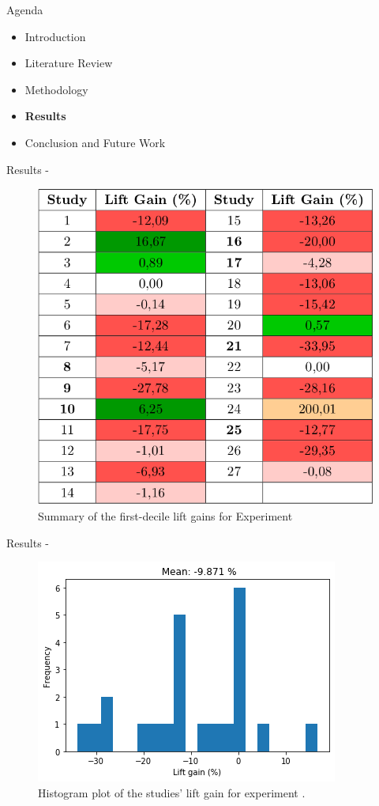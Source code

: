 \begin{frame}{Agenda}
\begin{itemize}
    \item Introduction
    \item Literature Review
    \item Methodology
    \item \textbf{Results}
    \item Conclusion and Future Work
\end{itemize}
\end{frame}


\begin{frame}{Results - \fullNameExperimentI{}} \pause
    \begin{figure}
        \centering
        \includegraphics[width=.6\linewidth]{fig/ch4-table-exp-i.png}
        \caption{Summary of the first-decile lift gains for Experiment \nameExperimentI}
    \end{figure}
\end{frame}


\begin{frame}{Results - \fullNameExperimentI{}}
    \begin{figure}
       \centering
       \includegraphics[width=.8\linewidth]{fig/ch4-lift-hist-plot-exp-i.png}
       \caption{Histogram plot of the studies' lift gain for experiment \nameExperimentI{}.}
       \label{fig:lift-hist-plot-exp-i}
    \end{figure}
\end{frame}

